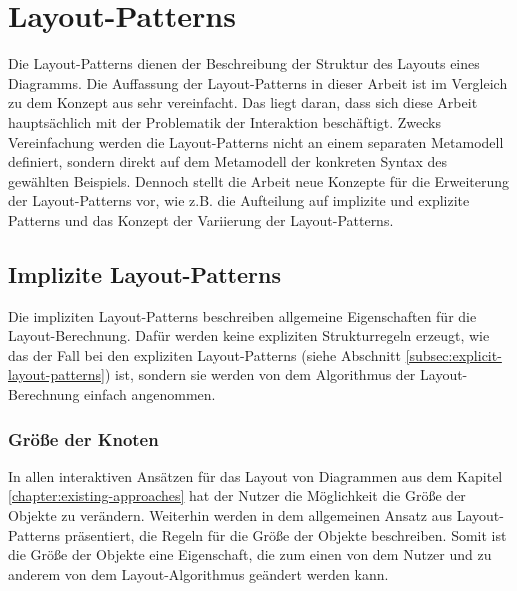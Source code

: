 
\section{Layout-Patterns}
\label{sec:layout-patterns}


Die Layout-Patterns dienen der Beschreibung der Struktur des Layouts eines Diagramms. Die Auffassung der Layout-Patterns in dieser Arbeit ist im Vergleich zu dem Konzept aus \cite{Maier12A-Pattern-based} sehr vereinfacht. Das liegt daran, dass sich diese Arbeit hauptsächlich mit der Problematik der Interaktion beschäftigt. Zwecks Vereinfachung werden die Layout-Patterns nicht an einem separaten Metamodell definiert, sondern direkt auf dem Metamodell der konkreten Syntax des gewählten Beispiels. Dennoch stellt die Arbeit neue Konzepte für die Erweiterung der Layout-Patterns vor, wie z.B. die Aufteilung auf implizite und explizite Patterns und das Konzept der Variierung der Layout-Patterns.

\subsection{Implizite Layout-Patterns}
\label{subsec:implicit-layout-patterns}

Die impliziten Layout-Patterns beschreiben allgemeine Eigenschaften für die Layout-Berechnung. Dafür werden keine expliziten Strukturregeln erzeugt, wie das der Fall bei den expliziten Layout-Patterns (siehe Abschnitt \ref{subsec:explicit-layout-patterns}) ist, sondern sie werden von dem Algorithmus der Layout-Berechnung einfach angenommen.

\subsubsection{Größe der Knoten}

In allen interaktiven Ansätzen für das Layout von Diagrammen aus dem Kapitel \ref{chapter:existing-approaches} hat der Nutzer die Möglichkeit die Größe der Objekte zu verändern. Weiterhin werden in dem allgemeinen Ansatz aus \cite{Maier12A-Pattern-based} Layout-Patterns präsentiert, die Regeln für die Größe der Objekte beschreiben. Somit ist die Größe der Objekte eine Eigenschaft, die zum einen von dem Nutzer und zu anderem von dem Layout-Algorithmus geändert werden kann.

